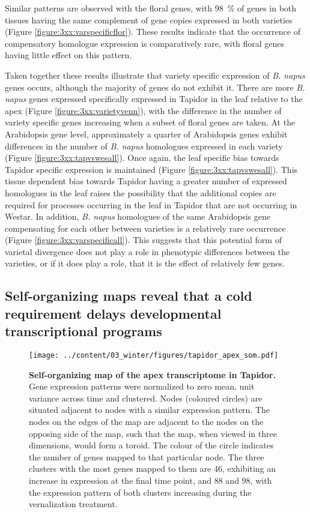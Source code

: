 \documentclass[12pt,]{book}
\begin{document}
Similar patterns are observed with the floral genes, with 98~\% of genes
in both tissues having the same complement of gene copies expressed in
both varieties (Figure \ref{figure:3xx:varspecificflor}). These results
indicate that the occurrence of compensatory homologue expression is
comparatively rare, with floral genes having little effect on this
pattern.

Taken together these results illustrate that variety specific expression
of \emph{B. napus} genes occurs, although the majority of genes do not
exhibit it. There are more \emph{B. napus} genes expressed specifically
expressed in Tapidor in the leaf relative to the apex (Figure
\ref{figure:3xx:varietyvenn}), with the difference in the number of
variety specific genes increasing when a subset of floral genes are
taken. At the Arabidopsis gene level, approximately a quarter of
Arabidopsis genes exhibit differences in the number of \emph{B. napus}
homologues expressed in each variety (Figure
\ref{figure:3xx:tapvswesall}). Once again, the leaf specific bias
towards Tapidor specific expression is maintained (Figure
\ref{figure:3xx:tapvswesall}). This tissue dependent bias towards
Tapidor having a greater number of expressed homologues in the leaf
raises the possibility that the additional copies are required for
processes occurring in the leaf in Tapidor that are not occurring in
Westar. In addition, \emph{B. napus} homologues of the same Arabidopsis
gene compensating for each other between varieties is a relatively rare
occurrence (Figure \ref{figure:3xx:varspecificall}). This suggests that
this potential form of varietal divergence does not play a role in
phenotypic differences between the varieties, or if it does play a role,
that it is the effect of relatively few genes.

\subsection{Self-organizing maps reveal that a cold requirement delays
developmental transcriptional programs}\label{section:winter:som}

\begin{figure}[htbp]
\centering
\texttt{[image: ../content/03\_winter/figures/tapidor\_apex\_som.pdf]}
\caption{\textbf{Self-organizing map of the apex transcriptome in
Tapidor.} Gene expression patterns were normalized to zero mean, unit
variance across time and clustered. Nodes (coloured circles) are
situated adjacent to nodes with a similar expression pattern. The nodes
on the edges of the map are adjacent to the nodes on the opposing side
of the map, such that the map, when viewed in three dimensions, would
form a toroid. The colour of the circle indicates the number of genes
mapped to that particular node. The three clusters with the most genes
mapped to them are 46, exhibiting an increase in expression at the final
time point, and 88 and 98, with the expression pattern of both clusters
increasing during the vernalization
treatment.}\label{figure:3xx:tapsomapex}
\end{figure}
\end{document}
